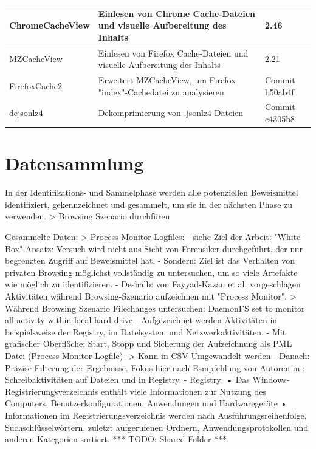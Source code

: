 \begin{table}[]
{\begin{tabular}{|l|l|l|}
ChromeCacheView                         & Einlesen von Chrome Cache-Dateien und visuelle Aufbereitung des Inhalts          & 2.46                                  \\ \hline
MZCacheView                             & Einlesen von Firefox Cache-Dateien und visuelle Aufbereitung des Inhalts         & 2.21                                  \\ \hline
FirefoxCache2                           & Erweitert MZCacheView, um Firefox "index"-Cachedatei zu analysieren              & Commit b50ab4f                        \\ \hline
dejsonlz4                               & Dekomprimierung von .jsonlz4-Dateien                                             & Commit c4305b8                        \\ \hline
\end{tabular}
}
\end{table}



\section{Datensammlung}

\cite{Izzati.2022}
In der Identifikations- und Sammelphase werden alle potenziellen Beweismittel identifiziert, gekennzeichnet und gesammelt, um sie in der nächsten Phase zu verwenden.
> Browsing Szenario durchfüren

Gesammelte Daten:
> Process Monitor Logfiles:
	- siehe Ziel der Arbeit: "White-Box"-Ansatz: Versuch wird nicht aus Sicht von Forensiker durchgeführt, der nur begrenzten Zugriff auf Beweismittel hat. 
	- Sondern: Ziel ist das Verhalten von privaten Browsing möglichst vollständig zu untersuchen, um so viele Artefakte wie möglich zu identifizieren.
	- Deshalb: von Fayyad-Kazan et al. vorgeschlagen \cite{Fayyad.2021} Aktivitäten während Browsing-Szenario aufzeichnen mit "Process Monitor".
		> Während Browsing Szenario Filechanges untersuchen: DaemonFS set to monitor all activity within local hard drive\cite{Ohana.2013}
	- Aufgezeichnet werden Aktivitäten in beispielsweise der Registry, im Dateisystem und Netzwerkaktivitäten.
	- Mit grafischer Oberfläche: Start, Stopp und Sicherung der Aufzeichnung als PML Datei (Process Monitor Logfile) -> Kann in CSV Umgewandelt werden
	- Danach: Präzise Filterung der Ergebnisse. Fokus hier nach Esmpfehlung von Autoren in \cite{Fayyad.2021}: Schreibaktivitäten auf Dateien und in Registry. 
		- Registry: \cite{Rochmadi.2017}
			•	Das Windows-Registrierungsverzeichnis enthält viele Informationen zur Nutzung des Computers, Benutzerkonfigurationen, Anwendungen und Hardwaregeräte
			•	Informationen im Registrierungsverzeichnis werden nach Ausführungsreihenfolge, Suchschlüsselwörtern, zuletzt aufgerufenen Ordnern, Anwendungsprotokollen und anderen Kategorien sortiert.
	*** TODO: Shared Folder ***

